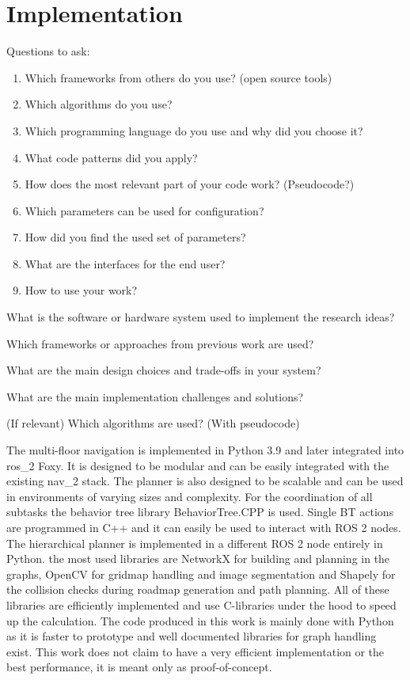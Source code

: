 \chapter{Implementation}
\label{sec:implementation}
Questions to ask:
\begin{enumerate}
    \item Which frameworks from others do you use? (open source tools)
    \item Which algorithms do you use?
    \item Which programming language do you use and why did you choose it?
    \item What code patterns did you apply?
    \item How does the most relevant part of your code work? (Pseudocode?)
    \item Which parameters can be used for configuration?
    \item How did you find the used set of parameters?   
    \item What are the interfaces for the end user?
    \item How to use your work?
\end{enumerate}

What is the software or hardware system used to implement the research ideas? 

Which frameworks or approaches from previous work are used? 

What are the main design choices and trade-offs in your system? 

What are the main implementation challenges and solutions? 

(If relevant) Which algorithms are used? (With pseudocode) 

The multi-floor navigation is implemented in Python 3.9 and later integrated into \gls{ros_2} Foxy. It is designed to be modular and can be easily integrated with the existing \gls{nav_2} stack. The planner is also designed to be scalable and can be used in environments of varying sizes and complexity. For the coordination of all subtasks the behavior tree library BehaviorTree.CPP \cite{auryn_robotics_behaviortreecpp_2023} is used. Single BT actions are programmed in C++ and it can easily be used to interact with ROS 2 nodes. The hierarchical planner is implemented in a different ROS 2 node entirely in Python. the most used libraries are NetworkX for building and planning in the graphs, OpenCV for gridmap handling and image segmentation and Shapely for the collision checks during roadmap generation and path planning. All of these libraries are efficiently implemented and use C-libraries under the hood to speed up the calculation. The code produced in this work is mainly done with Python as it is faster to prototype and well documented libraries for graph handling exist. This work does not claim to have a very efficient implementation or the best performance, it is meant only as proof-of-concept.

